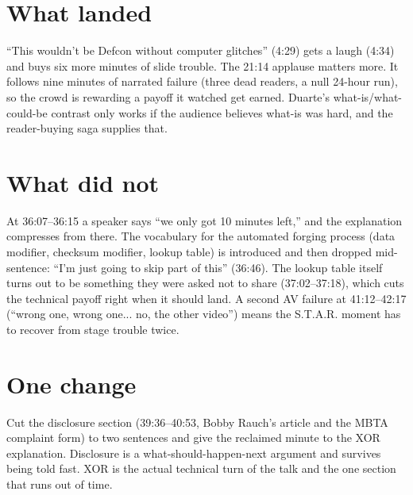 \documentclass[11pt]{article}
\begin{document}
\section{What landed}
``This wouldn't be Defcon without computer glitches'' (4:29) gets a laugh (4:34) and buys six more minutes of slide trouble. The 21:14 applause matters more. It follows nine minutes of narrated failure (three dead readers, a null 24-hour run), so the crowd is rewarding a payoff it watched get earned. Duarte's what-is/what-could-be contrast only works if the audience believes what-is was hard, and the reader-buying saga supplies that.

\section{What did not}
At 36:07--36:15 a speaker says ``we only got 10 minutes left,'' and the explanation compresses from there. The vocabulary for the automated forging process (data modifier, checksum modifier, lookup table) is introduced and then dropped mid-sentence: ``I'm just going to skip part of this'' (36:46). The lookup table itself turns out to be something they were asked not to share (37:02--37:18), which cuts the technical payoff right when it should land. A second AV failure at 41:12--42:17 (``wrong one, wrong one... no, the other video'') means the S.T.A.R. moment has to recover from stage trouble twice.

\section{One change}
Cut the disclosure section (39:36--40:53, Bobby Rauch's article and the MBTA complaint form) to two sentences and give the reclaimed minute to the XOR explanation. Disclosure is a what-should-happen-next argument and survives being told fast. XOR is the actual technical turn of the talk and the one section that runs out of time.
\end{document}
